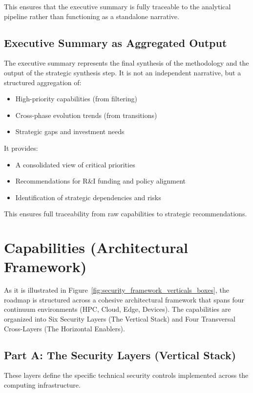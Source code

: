 \documentclass{ieeeaccess}
\begin{document}
This ensures that the executive summary is fully traceable to the analytical pipeline rather than functioning as a standalone narrative.
\subsection{Executive Summary as Aggregated Output}

The executive summary represents the final synthesis of the methodology and the output of the strategic synthesis step. It is not an independent narrative, but a structured aggregation of:

\begin{itemize}
    \item High-priority capabilities (from filtering)
    \item Cross-phase evolution trends (from transitions)
    \item Strategic gaps and investment needs
\end{itemize}

It provides:

\begin{itemize}
    \item A consolidated view of critical priorities
    \item Recommendations for R\&I funding and policy alignment
    \item Identification of strategic dependencies and risks
\end{itemize}

This ensures full traceability from raw capabilities to strategic recommendations.


\newpage
\section{Capabilities (Architectural Framework)}
\label{sec:arch}


As it is illustrated in Figure~\ref{fig:security_framework_verticals_boxes}, the roadmap is structured across a cohesive architectural framework that spans four continuum environments (HPC, Cloud, Edge, Devices). The capabilities are organized into Six Security Layers (The Vertical Stack) and Four Transversal Cross-Layers (The Horizontal Enablers).

\subsection*{Part A: The Security Layers (Vertical Stack)}
These layers define the specific technical security controls implemented across the computing infrastructure.
\end{document}
